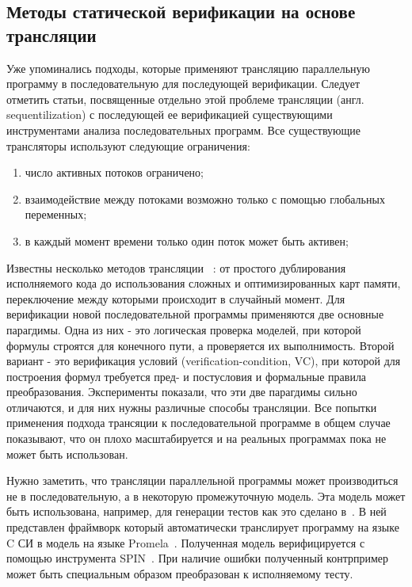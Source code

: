\subsection{Методы статической верификации на основе трансляции}

Уже упоминались подходы, которые применяют трансляцию параллельную программу в последовательную для последующей верификации.
Следует отметить статьи, посвященные отдельно этой проблеме трансляции (англ. sequentilization) с последующей ее верификацией существующими инструментами анализа последовательных программ.
Все существующие трансляторы используют следующие ограничения: 
\begin{enumerate}
\item число активных потоков ограничено;
\item взаимодействие между потоками возможно только с помощью глобальных переменных;
\item в каждый момент времени только один поток может быть активен;
\end{enumerate}
Известны несколько методов трансляции ~\cite{Torre:2009, Ghafari:2010,Inverso:2014, Tomasco:2015}: от простого дублирования исполняемого кода до использования сложных и оптимизированных карт памяти, переключение между которыми происходит в случайный момент.
Для верификации новой последовательной программы применяются две основные парагдимы. Одна из них - это логическая проверка моделей, при которой формулы строятся для конечного пути, а проверяется их выполнимость.
Второй вариант - это верификация условий (verification-condition, VC), при которой для построения формул требуется пред- и постусловия и формальные правила преобразования. Эксперименты показали, что эти две парагдимы сильно отличаются, и для них нужны различные способы трансляции. 
Все попытки применения подхода трансяции к последовательной программе в общем случае показывают, что он плохо масштабируется и на реальных программах пока не может быть использован. 

Нужно заметить, что трансляции параллельной программы может производиться не в последовательную, а в некоторую промежуточную модель.
Эта модель может быть использована, например, для генерации тестов как это сделано в~\cite{KIM200921}.
В ней представлен фраймворк который автоматически транслирует программу на языке C СИ в модель на языке Promela~\cite{SPIN}.
Полученная модель верифицируется с помощью инструмента SPIN~\cite{SPIN}.
При наличие ошибки полученный контрпример может быть специальным образом преобразован к исполняемому тесту.

